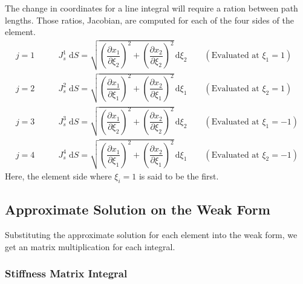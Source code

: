 \documentclass[11pt, a4paper]{article}
\numberwithin{equation}{section}
\begin{document}
The change in coordinates for a line integral will require a ration between path lengths. Those ratios, Jacobian, are computed for each of the four sides of the element.
\begin{align*}
j=1 & \qquad J_s^1\; \mathrm{d} S  = \sqrt{\left(\dfrac{\partial x_1}{\partial \xi_2}\right)^2 + \left(\dfrac{\partial x_2}{\partial \xi_2}\right)^2}\, \mathrm{d} \xi_2 \qquad (\text{Evaluated at } \xi_1=1)
\\
j=2 & \qquad J_s^2\; \mathrm{d} S  =\sqrt{\left(\dfrac{\partial x_1}{\partial \xi_1}\right)^2 + \left(\dfrac{\partial x_2}{\partial \xi_1}\right)^2}\, \mathrm{d} \xi_1 \qquad (\text{Evaluated at } \xi_2=1)
\\
j=3 & \qquad J_s^3\; \mathrm{d} S = \sqrt{\left(\dfrac{\partial x_1}{\partial \xi_2}\right)^2 + \left(\dfrac{\partial x_2}{\partial \xi_2}\right)^2}\, \mathrm{d} \xi_2 \qquad (\text{Evaluated at } \xi_1=-1)
\\
j=4 & \qquad J_s^4\; \mathrm{d} S  = \sqrt{\left(\dfrac{\partial x_1}{\partial \xi_1}\right)^2 + \left(\dfrac{\partial x_2}{\partial \xi_1}\right)^2}\, \mathrm{d} \xi_1 \qquad (\text{Evaluated at } \xi_2=-1)
\end{align*}
Here, the element side where $\xi_i=1$ is said to be the first.


\subsection{Approximate Solution on the Weak Form}

Substituting the approximate solution for each element into the weak form, we get an matrix multiplication for each integral.

\subsubsection{Stiffness Matrix Integral}
\end{document}
